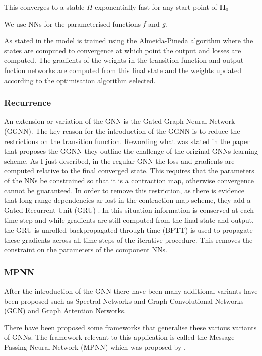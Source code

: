 \documentclass[]{../resources/final_report}
\begin{document}
This converges to a stable $H$ exponentially fast for any start point of $\textbf{H}_0$

We use NNs for the parameterised functions $\emph{f}$ and $\emph{g}$.

As stated in \cite{GGNN} the model is trained using the Almeida-Pineda algorithm \cite{Almeida}\cite{Pineda} where 
the states are computed to convergence at which point the output and losses are computed. 
The gradients of the weights in the transition function and output fuction networks are computed from
this final state and the weights updated according to the optimisation algorithm selected.


\subsubsection{Recurrence}

An extension or variation of the GNN is the Gated Graph Neural Network (GGNN). The key reason for the introduction
of the GGNN is to reduce the restrictions on the transition function. Rewording what was stated in \cite{GGNN} the 
paper that proposes the GGNN they outline the challenge of the original GNNs learning scheme.
As I just described, in the regular GNN the loss and gradients are computed relative to the final converged state.
This requires that the parameters of the NNs be constrained so that it is a contraction map, otherwise convergence cannot be
guaranteed. In order to remove this restriction, as there is evidence that long range dependencies ar lost in the
contraction map scheme, they add a Gated Recurrent Unit (GRU) \cite{GRU}. In this situation
information is conserved at each time step and while gradients are still computed from the
final state and output, the GRU is unrolled backpropagated through time (BPTT) \cite{Pineda} is used to propagate these
gradients across all time steps of the iterative procedure. This removes the constraint on the parameters of the
component NNs.


\subsubsection{MPNN}

After the introduction of the GNN there have been many additional variants have been proposed
such as Spectral Networks and Graph Convolutional Networks (GCN) and Graph Attention Networks.

There have been proposed some frameworks that generalise these various variants of GNNs.
The framework relevant to this application is called the Message Passing Neural Network (MPNN) which was proposed by \cite{mpnn}.
\end{document}
